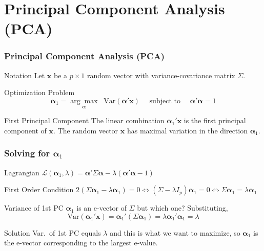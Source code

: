 \section{Principal Component Analysis (PCA)}
\begin{frame}
  \frametitle{Principal Component Analysis (PCA)}
  
  \begin{block}{Notation}
  Let $\mathbf{x}$ be a $p\times 1$ random vector with variance-covariance matrix $\Sigma$.
  \end{block}

  \begin{block}{Optimization Problem}
    \vspace{-1em}
    \[\boldsymbol{\alpha}_1 = \underset{\boldsymbol{\alpha}}{\arg \max} \; \;\mbox{Var}(\boldsymbol{\alpha}' \mathbf{x}) \quad \text{ subject to } \quad \boldsymbol{\alpha}'\boldsymbol{\alpha} = 1\]
  \end{block}

  \begin{block}{First Principal Component}
    The linear combination $\boldsymbol{\alpha}_1' \mathbf{x}$ is the \alert{first principal component} of $\mathbf{x}$.
    The random vector $\mathbf{x}$ has \alert{maximal variation} in the direction $\mathbf{\alpha}_1$.
  \end{block}
\end{frame}
\begin{frame}
  \frametitle{Solving for $\boldsymbol{\alpha}_1$}

  \begin{block}{Lagrangian}
  $\mathcal{L}(\boldsymbol{\alpha}_1, \lambda) = \boldsymbol{\alpha}' \Sigma \boldsymbol{\alpha} - \lambda(\boldsymbol{\alpha}' \boldsymbol{\alpha} - 1)$
  \end{block}

  \begin{block}{First Order Condition}
    $2 (\Sigma\boldsymbol{\alpha}_1 - \lambda \boldsymbol{\alpha}_1) = 0 \iff (\Sigma - \lambda I_p)\boldsymbol{\alpha}_1 = 0 \iff \Sigma \boldsymbol{\alpha}_1 = \lambda \boldsymbol{\alpha}_1$
  \end{block}

  \begin{block}{Variance of 1st PC}
    $\boldsymbol{\alpha}_1$ is an e-vector of $\Sigma$ but which one? 
    Substituting, 
    \[
      \mbox{Var}(\boldsymbol{\alpha}_1' \mathbf{x}) = \boldsymbol{\alpha}_1'(\Sigma \boldsymbol{\alpha}_1) = \lambda \boldsymbol{\alpha}_1' \boldsymbol{\alpha}_1 = \lambda
    \]
  \end{block}
  \vspace{-1em}

  \begin{alertblock}{Solution}
    Var.\ of 1st PC equals $\lambda$ and this is what we want to \alert{maximize}, so $\boldsymbol{\alpha}_1$ is the e-vector corresponding to the largest e-value.
  \end{alertblock}


\end{frame}
